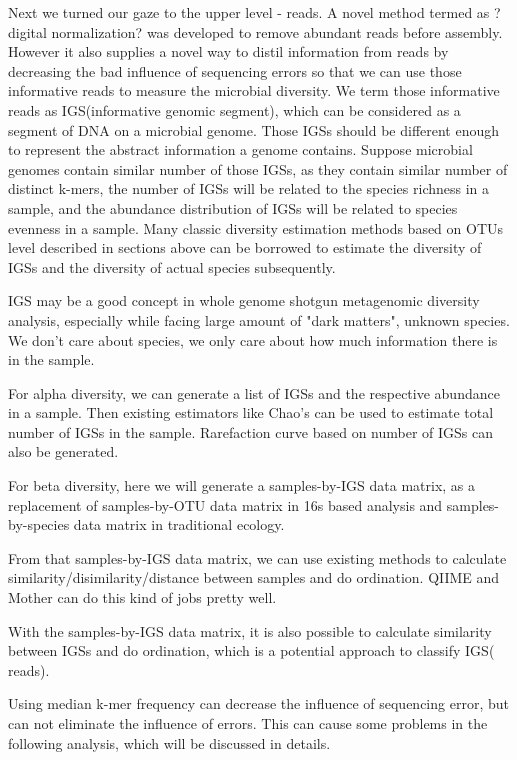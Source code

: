 \documentclass{article}
\begin{document}
Next we turned our gaze to the upper level - reads. A novel method termed as ?digital normalization? was developed to remove abundant reads before assembly. However it also supplies a novel way to distil information from reads by decreasing the bad influence of sequencing errors so that we can use those informative reads to measure the microbial diversity. We term those informative reads as IGS(informative genomic segment), which can be considered as a segment of DNA on a microbial genome. Those IGSs should be different enough to represent the abstract information a genome contains. Suppose microbial genomes contain similar number of those IGSs, as they contain similar number of distinct k-mers, the number of IGSs will be related to the species richness in a sample, and the abundance distribution of IGSs will be related to species evenness in a sample. Many classic diversity estimation methods based on OTUs level described in sections above can be borrowed to estimate the diversity of IGSs and the diversity of actual species subsequently.

IGS may be a good concept in whole genome shotgun metagenomic diversity analysis, especially while facing large amount of "dark matters", unknown species. We don't care about species, we only care about how much information there is in the sample.


For alpha diversity, we can generate a list of IGSs and the respective abundance in a sample. Then existing estimators like Chao's can be used to estimate total number of IGSs in the sample. Rarefaction curve based on number of IGSs can also be generated. 

For beta diversity, here we will generate a samples-by-IGS data matrix, as a replacement of samples-by-OTU data matrix in 16s based analysis and samples-by-species data matrix in traditional ecology. 


From that samples-by-IGS data matrix, we can use existing methods to calculate similarity/disimilarity/distance between samples and do ordination. QIIME and Mother can do this kind of jobs pretty well.

With the samples-by-IGS data matrix, it is also possible to calculate similarity between IGSs and do ordination, which is a potential approach to classify IGS( reads).

Using median k-mer frequency can decrease the influence of sequencing error, but can not eliminate the influence of errors. This can cause some problems in the following analysis, which will be discussed in details.
\end{document}
